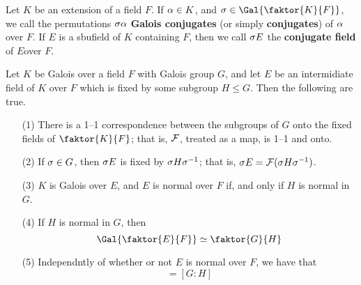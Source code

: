 \begin{definition}
    Let $K$ be an extension of a field  $F$. If  $\alpha \in K$, and  $\s \in
    \Gal{\faktor{K}{F}}$, we call the permutations $\sigma\alpha$  \textbf{Galois
    conjugates} (or simply \textbf{conjugates}) of $\alpha$ over $F$. If $E$ is a
    sbufield of  $K$ containing  $F$, then we call  $\sigma{E}$ the
    \textbf{conjugate field} of $E$over  $F$.
\end{definition}

\begin{theorem}\label{2.2.4}
    Let $K$ be Galois over a field  $F$ with Galois group $G$, and let $E$ be an
    intermidiate field of $K$ over $F$ which is fixed by some subgroup $H \leq
    G$. Then the following are true.
    \begin{enumerate}
        \item[(1)] There is a 1--1 correspondence between the subgroups of $G$
            onto the fixed fields of $\faktor{K}{F}$; that is, $\mathcal{F}$, treated as
            a map, is 1--1 and onto.

        \item[(2)] If $\sigma \in G$, then $\sigma{E}$ is fixed by $\sigma{H}\sigma^{-1}$; that
            is, $\sigma{E}=\mathcal{F}(\sigma{H}\sigma^{-1})$.

        \item[(3)] $K$ is Galois over $E$, and $E$ is normal over  $F$ if, and
            only if $H$ is normal in $G$.

        \item[(4)] If $H$ is normal in $G$, then
            \begin{equation*}
            \Gal{\faktor{E}{F}} \simeq \faktor{G}{H}
            \end{equation*}

        \item[(5)] Independntly of whether or not $E$ is normal over  $F$, we
            have that
            \begin{equation*}
                [E:F]=[G:H]
            \end{equation*}
    \end{enumerate}
\end{theorem}
